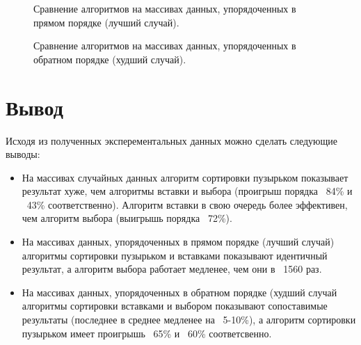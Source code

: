 \begin{figure}[!h]
	\centering
	\captionsetup{justification=centering}
	\caption{Сравнение алгоритмов на массивах данных, упорядоченных в прямом порядке (лучший случай).}
	\label{plt:time_asc}
\end{figure}

\begin{figure}[!h]
	\centering
	\captionsetup{justification=centering}
	\caption{Сравнение алгоритмов на массивах данных, упорядоченных в обратном порядке (худший случай).}
	\label{plt:time_desc}
\end{figure}


\captionsetup{singlelinecheck = false, justification=centering}


\section{Вывод}

Исходя из полученных эксперементальных данных можно сделать следующие выводы:
\begin{itemize}
	\item На массивах случайных данных алгоритм сортировки пузырьком показывает результат хуже, чем алгоритмы вставки и выбора (проигрыш порядка ~84\%  и ~43\% соответственно). Алгоритм вставки в свою очередь более эффективен, чем алгоритм выбора (выигрышь порядка ~72\%).
	\item На массивах данных, упорядоченных в прямом порядке (лучший случай) алгоритмы сортировки пузырьком и вставками показывают идентичный результат, а алгоритм выбора работает медленее, чем они в ~1560 раз. 
	\item На массивах данных, упорядоченных в обратном порядке (худший случай алгоритмы сортировки вставками и выбором показывают сопоставимые результаты (последнее в среднее медленее на ~5-10\%), а алгоритм сортировки пузырьком имеет проигрышь ~65\% и ~60\% соответсвенно. 

\end{itemize}



